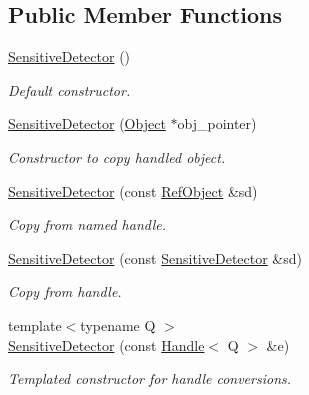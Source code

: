 \subsection*{Public Member Functions}
\begin{DoxyCompactItemize}
\item 
\hyperlink{class_d_d4hep_1_1_geometry_1_1_sensitive_detector_a7582e36657fd4099441d82cdf12fe638}{SensitiveDetector} ()
\begin{DoxyCompactList}\small\item\em Default constructor. \item\end{DoxyCompactList}\item 
\hyperlink{class_d_d4hep_1_1_geometry_1_1_sensitive_detector_a52024ca16cb8a4a3d81802ba224efbe3}{SensitiveDetector} (\hyperlink{class_d_d4hep_1_1_geometry_1_1_sensitive_detector_object}{Object} $\ast$obj\_\-pointer)
\begin{DoxyCompactList}\small\item\em Constructor to copy handled object. \item\end{DoxyCompactList}\item 
\hyperlink{class_d_d4hep_1_1_geometry_1_1_sensitive_detector_a6cdd000bbf0d6712cdf5348a4d909198}{SensitiveDetector} (const \hyperlink{class_d_d4hep_1_1_handle}{RefObject} \&sd)
\begin{DoxyCompactList}\small\item\em Copy from named handle. \item\end{DoxyCompactList}\item 
\hyperlink{class_d_d4hep_1_1_geometry_1_1_sensitive_detector_a70d28c0848133d4a915dc23c46afb7bf}{SensitiveDetector} (const \hyperlink{class_d_d4hep_1_1_geometry_1_1_sensitive_detector}{SensitiveDetector} \&sd)
\begin{DoxyCompactList}\small\item\em Copy from handle. \item\end{DoxyCompactList}\item 
{\footnotesize template$<$typename Q $>$ }\\\hyperlink{class_d_d4hep_1_1_geometry_1_1_sensitive_detector_aea96c495ac02e7ce21cf05496be02309}{SensitiveDetector} (const \hyperlink{class_d_d4hep_1_1_handle}{Handle}$<$ Q $>$ \&e)
\begin{DoxyCompactList}\small\item\em Templated constructor for handle conversions. \item\end{DoxyCompactList}\item 

\end{DoxyCompactItemize}
